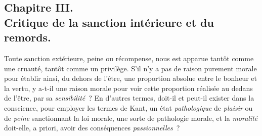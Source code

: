 \documentclass[french,twoside]{book} %
\begin{document}
\subsection[{Chapitre III. Critique de la sanction intérieure et du remords.}]{Chapitre III. \\
Critique de la sanction intérieure et du remords.}
\noindent Toute sanction extérieure, peine ou récompense, nous est apparue tantôt comme une cruauté, tantôt comme un privilège. S’il n’y a pas de raison purement morale pour établir ainsi, du dehors de l’être, une proportion absolue entre le bonheur et la vertu, y a-t-il une raison morale pour voir cette proportion réalisée au dedans de l’être, par sa \emph{sensibilité} ? En d’autres termes, doit-il et peut-il exister dans la conscience, pour employer les termes de Kant, un état \emph{pathologique} de \emph{plaisir} ou de \emph{peine} sanctionnant la loi morale, une sorte de pathologie morale, et la \emph{moralité} doit-elle, a priori, avoir des conséquences \emph{passionnelles} ?\par
\end{document}
